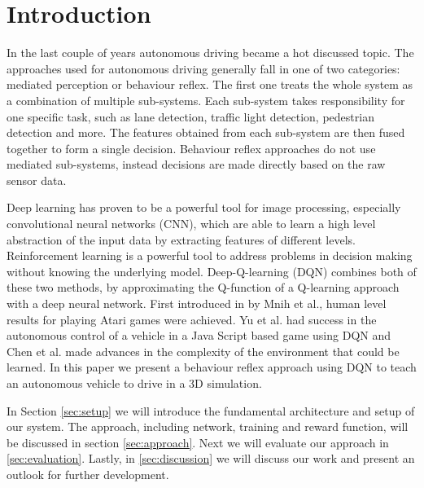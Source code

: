 
\section{Introduction}

In the last couple of years autonomous driving became a hot discussed topic. The approaches used for autonomous driving generally fall in one of two categories: mediated perception or behaviour reflex. The first one treats the whole system as a combination of multiple sub-systems. Each sub-system takes responsibility for one specific task, such as lane detection, traffic light detection, pedestrian detection and more. The features obtained from each sub-system are then fused together to form a single decision. Behaviour reflex approaches do not use mediated sub-systems, instead decisions are made directly based on the raw sensor data.

Deep learning has proven to be a powerful tool for image processing, especially convolutional neural networks (CNN), which are able to learn a high level abstraction of the input data by extracting features of different levels. Reinforcement learning is a powerful tool to address problems in decision making without knowing the underlying model. Deep-Q-learning (DQN) combines both of these two methods, by approximating the Q-function of a Q-learning approach with a deep neural network. First introduced in \cite{Mnih13} by Mnih et al., human level results for playing Atari games were achieved. Yu et al. \cite{yudeep} had success in the autonomous control of a vehicle in a Java Script based game using DQN and Chen et al. \cite{chen2015deepdriving} made advances in the complexity of the environment that could be learned. In this paper we present a behaviour reflex approach using DQN to teach an autonomous vehicle to drive in a 3D simulation. 

In Section \ref{sec:setup} we will introduce the fundamental architecture and setup of our system. The approach, including network, training and reward function, will be discussed in section \ref{sec:approach}. Next we will evaluate our approach in \ref{sec:evaluation}. Lastly, in \ref{sec:discussion} we will discuss our work and present an outlook for further development.